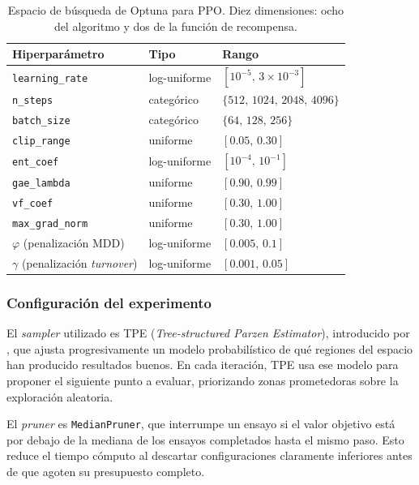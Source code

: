 \documentclass[IB,a4paper]{TFUOC}
\begin{document}
\begin{table}[h]
\centering
\small
\renewcommand{\arraystretch}{1.25}
\begin{tabular}{|l|l|l|}
\hline
\textbf{Hiperparámetro} & \textbf{Tipo} & \textbf{Rango} \\ \hline
\texttt{learning\_rate}   & log-uniforme & $[10^{-5},\, 3\!\times\!10^{-3}]$ \\ \hline
\texttt{n\_steps}         & categórico   & $\{512,\, 1024,\, 2048,\, 4096\}$ \\ \hline
\texttt{batch\_size}      & categórico   & $\{64,\, 128,\, 256\}$ \\ \hline
\texttt{clip\_range}      & uniforme     & $[0.05,\, 0.30]$ \\ \hline
\texttt{ent\_coef}        & log-uniforme & $[10^{-4},\, 10^{-1}]$ \\ \hline
\texttt{gae\_lambda}      & uniforme     & $[0.90,\, 0.99]$ \\ \hline
\texttt{vf\_coef}         & uniforme     & $[0.30,\, 1.00]$ \\ \hline
\texttt{max\_grad\_norm}  & uniforme     & $[0.30,\, 1.00]$ \\ \hline
$\varphi$ (penalización MDD)      & log-uniforme & $[0.005,\, 0.1]$ \\ \hline
$\gamma$ (penalización \textit{turnover}) & log-uniforme & $[0.001,\, 0.05]$ \\ \hline
\end{tabular}
\caption{Espacio de búsqueda de Optuna para PPO. Diez dimensiones: ocho del algoritmo y dos de la función de recompensa.}
\label{tab:optuna_search_space}
\end{table}

\subsubsection*{Configuración del experimento}

El \textit{sampler} utilizado es TPE (\textit{Tree-structured Parzen Estimator}), introducido por \citet{bergstra2011tpe}, que ajusta progresivamente un modelo probabilístico de qué regiones del espacio han producido resultados buenos. En cada iteración, TPE usa ese modelo para proponer el siguiente punto a evaluar, priorizando zonas prometedoras sobre la exploración aleatoria.

El \textit{pruner} es \texttt{MedianPruner}, que interrumpe un ensayo si el valor objetivo está por debajo de la mediana de los ensayos completados hasta el mismo paso. Esto reduce el tiempo cómputo al descartar configuraciones claramente inferiores antes de que agoten su presupuesto completo.
\end{document}
